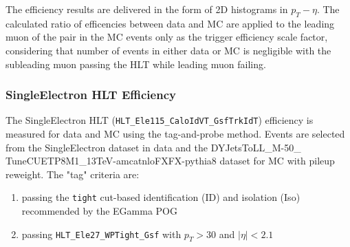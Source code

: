 \vspace{0.3cm}
The efficiency results are delivered in the form of 2D histograms in $p_T - \eta$. The calculated ratio of efficencies between data and MC are applied to the leading muon of the pair in the MC events only as the trigger efficiency scale factor, considering that number of events in either data or MC is negligible with the subleading muon passing the HLT while leading muon failing.

\subsubsection{SingleElectron HLT Efficiency}
The SingleElectron HLT (\texttt{HLT\_Ele115\_CaloIdVT\_GsfTrkIdT}) efficiency is measured for data and MC using the tag-and-probe method. Events are selected from the SingleElectron dataset in data and the DYJetsToLL\_M-50\_ TuneCUETP8M1\_13TeV-amcatnloFXFX-pythia8 dataset for MC with pileup reweight. The "tag" criteria are:
\begin{enumerate}
\item passing the \texttt{tight} cut-based identification (ID) and isolation (Iso) recommended by the EGamma POG %
\item passing \texttt{HLT\_Ele27\_WPTight\_Gsf} with $p_T>30$ and $|\eta|<2.1$
\end{enumerate}


